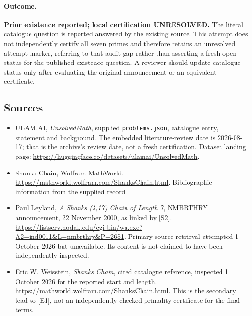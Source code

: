 \documentclass[11pt,a4paper]{article}
\begin{document}
\paragraph{Outcome.}
\textbf{Prior existence reported; local certification UNRESOLVED.}
The literal catalogue question is reported answered by the existing
source. This attempt does not independently certify all seven primes
and therefore retains an unresolved attempt marker, referring to that
audit gap rather than asserting a fresh open status for the published
existence question. A reviewer should update catalogue status only
after evaluating the original announcement or an equivalent certificate.

\subsection{Sources}

{\small

\begin{itemize}

\item[\hypertarget{source:statement:1}{S1}] ULAM.AI, \emph{UnsolvedMath}, supplied \texttt{problems.json}, catalogue entry, statement and background. The embedded literature-review date is 2026-08-17; that is the archive’s review date, not a fresh certification. Dataset landing page: \url{https://huggingface.co/datasets/ulamai/UnsolvedMath}.

\item[\hypertarget{source:statement:2}{S2}] Shanks Chain, Wolfram MathWorld. \url{https://mathworld.wolfram.com/ShanksChain.html}. Bibliographic information from the supplied record.


\item[E1] Paul Leyland, \emph{A Shanks (4,17) Chain of Length 7},
NMBRTHRY announcement, 22 November 2000, as linked by [S2].
\url{https://listserv.nodak.edu/cgi-bin/wa.exe?A2=ind0011&L=nmbrthry&P=2651}.
Primary-source retrieval attempted 1 October 2026 but unavailable.
Its content is not claimed to have been independently inspected.
\item[E2] Eric W. Weisstein, \emph{Shanks Chain}, cited catalogue
reference, inspected 1 October 2026 for the reported start and length.
\url{https://mathworld.wolfram.com/ShanksChain.html}.
This is the secondary lead to [E1], not an independently checked
primality certificate for the final terms.

\end{itemize}

}

\label{end:statement}
\end{document}

